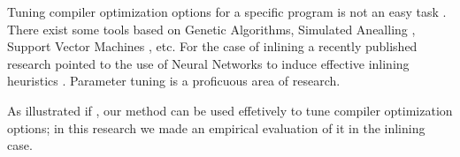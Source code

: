 Tuning compiler optimization options for a specific program is not an easy
task \cite{Zhong2009}. There exist some tools based on Genetic Algorithms,
Simulated Anealling \cite{Zhong2009}, Support Vector Machines \cite{SanchezCGO11},
etc. For the case of inlining a recently published research pointed to the
use of Neural Networks to induce effective inlining heuristics \cite{KulkarniCGO13}.
Parameter tuning is a proficuous area of research.

As illustrated if , our method can be used effetively
to tune compiler optimization options; in this research we made an empirical
evaluation of it in the inlining case.